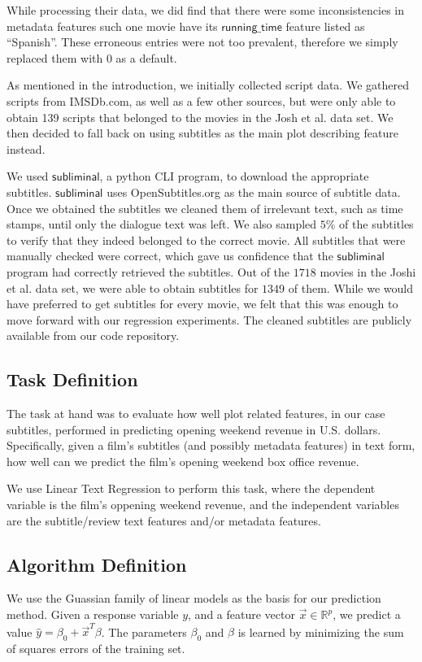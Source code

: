 \documentclass[11pt]{article}
\begin{document}
While processing their data, we
did find that there were some inconsistencies in metadata features such one movie
have its $\mathsf{running\_time}$ feature listed as ``Spanish''. These erroneous entries
were not too prevalent, therefore we simply replaced them with
0 as a default.

As mentioned in the introduction, we initially collected script data. We
gathered scripts from IMSDb.com, as well as a few other sources, but were only able
to obtain 139 scripts that belonged to the movies in the Josh et al. data set. We then
decided to fall back on using subtitles as the main plot describing feature instead.

We used $\mathsf{subliminal}$, a python CLI program, to download the appropriate
subtitles. $\mathsf{subliminal}$ uses OpenSubtitles.org as the main source of subtitle
data. Once we obtained the subtitles we cleaned them of irrelevant text, such as time
stamps, until only the dialogue text was left. We also sampled $5$\% of the subtitles to
verify that they indeed belonged to the correct movie. All subtitles that were manually
checked were correct, which gave us confidence that the $\mathsf{subliminal}$ program
had correctly retrieved the subtitles. Out of the $1718$ movies in the Joshi
et al. data set, we were able to obtain subtitles for $1349$ of them.
While we would have preferred to get subtitles for every movie, we felt that this was
enough to move forward with our regression experiments. The cleaned subtitles are
publicly available from our code repository.

\subsection{Task Definition}
The task at hand was to evaluate how well plot related features, in our case subtitles,
performed in predicting opening weekend revenue in U.S. dollars. Specifically, given
a film's subtitles (and possibly metadata features) in text form, how well can we
predict the film's opening weekend box office revenue.

We use Linear Text Regression to perform this task, where the dependent variable is
the film's oppening weekend revenue, and the independent variables are the subtitle/review
text features and/or metadata features.

\subsection{Algorithm Definition}
We use the Guassian family of linear models as the basis for our prediction method.
Given a response variable $y$, and a feature vector $\vec{x} \in \mathbb{R}^p$, we
predict a value $\hat{y} = \beta_0 + \vec{x}^T \beta$. The parameters $\beta_0$ and $\beta$
is learned by minimizing the sum of squares errors of the training set.
\end{document}
